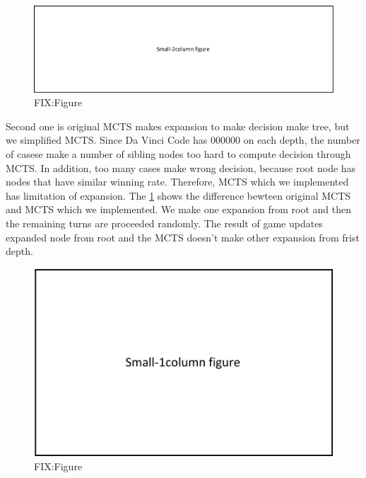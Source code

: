 \documentclass[conference]{IEEEtran}
\begin{document}
 \begin{figure}
\includegraphics{figures/fit_2col.pdf}
\caption{FIX:Figure}
\label{fig:compare_expansion}
\end{figure}

 Second one is original MCTS makes expansion to make decision make tree, but we simplified MCTS. 
 Since Da Vinci Code has 000000 on each depth, the number of casese make a number of sibling nodes too hard to compute decision through MCTS. 
 In addition, too many cases make wrong decision, because root node has nodes that have similar winning rate. 
 Therefore, MCTS which we implemented has limitation of expansion. 
 The \cref{fig:compare_expansion} shows the difference bewteen original MCTS and MCTS which we implemented. 
 We make one expansion from root and then the remaining turns are proceeded randomly. 
 The result of game updates expanded node from root and the MCTS doesn't make other expansion from frist depth. 


\begin{figure}
\includegraphics{figures/fit_1col.pdf}
\caption{FIX:Figure}
\label{fig:implementation}
\end{figure}
\end{document}
